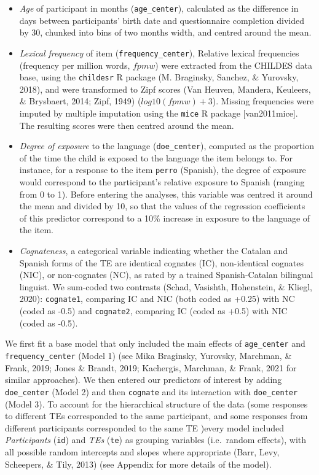 \documentclass[
  english,
  man,man,floatsintext]{apa6}
\providecommand{\tightlist}{%
  \setlength{\itemsep}{0pt}\setlength{\parskip}{0pt}}
\begin{document}
\begin{itemize}
\tightlist
\item
  \emph{Age} of participant in months (\texttt{age\_center}), calculated as the difference in days between participants' birth date and questionnaire completion divided by 30, chunked into bins of two months width, and centred around the mean.
\item
  \emph{Lexical frequency} of item (\texttt{frequency\_center}), Relative lexical frequencies (frequency per million words, \(fpmw\)) were extracted from the CHILDES data base, using the \texttt{childesr} R package (M. Braginsky, Sanchez, \& Yurovsky, 2018), and were transformed to Zipf scores (Van Heuven, Mandera, Keuleers, \& Brysbaert, 2014; Zipf, 1949) (\(log10(fpmw)+3\)). Missing frequencies were imputed by multiple imputation using the \texttt{mice} R package {[}van2011mice{]}. The resulting scores were then centred around the mean.
\item
  \emph{Degree of exposure} to the language (\texttt{doe\_center}), computed as the proportion of the time the child is exposed to the language the item belongs to. For instance, for a response to the item \texttt{perro} (Spanish), the degree of exposure would correspond to the participant's relative exposure to Spanish (ranging from 0 to 1). Before entering the analyses, this variable was centred it around the mean and divided by 10, so that the values of the regression coefficients of this predictor correspond to a 10\% increase in exposure to the language of the item.
\item
  \emph{Cognateness}, a categorical variable indicating whether the Catalan and Spanish forms of the TE are identical cognates (IC), non-identical cognates (NIC), or non-cognates (NC), as rated by a trained Spanish-Catalan bilingual linguist. We sum-coded two contrasts (Schad, Vasishth, Hohenstein, \& Kliegl, 2020): \texttt{cognate1}, comparing IC and NIC (both coded as +0.25) with NC (coded as -0.5) and \texttt{cognate2}, comparing IC (coded as +0.5) with NIC (coded as -0.5).
\end{itemize}

We first fit a base model that only included the main effects of \texttt{age\_center} and \texttt{frequency\_center} (Model 1) (see Mika Braginsky, Yurovsky, Marchman, \& Frank, 2019; Jones \& Brandt, 2019; Kachergis, Marchman, \& Frank, 2021 for similar approaches). We then entered our predictors of interest by adding \texttt{doe\_center} (Model 2) and then \texttt{cognate} and its interaction with \texttt{doe\_center} (Model 3). To account for the hierarchical structure of the data (some responses to different TEs corresponded to the same participant, and some responses from different participants corresponded to the same TE )every model included \emph{Participants} (\texttt{id}) and \emph{TEs} (\texttt{te}) as grouping variables (i.e.~random effects), with all possible random intercepts and slopes where appropriate (Barr, Levy, Scheepers, \& Tily, 2013) (see Appendix for more details of the model).
\end{document}
